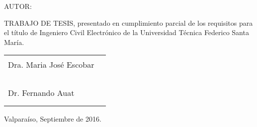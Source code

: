 \vspace{20mm}

\noindent AUTOR:

\vspace{5mm}


\vspace{15mm}

\noindent TRABAJO DE TESIS, presentado en cumplimiento parcial de
los requisitos para el t\'itulo de Ingeniero Civil Electr\'onico de la Universidad
T\'ecnica Federico Santa Mar\'ia.

\vspace{15mm}

\begin{tabular}{p{60mm}c}
Dra. Maria Jos\'e Escobar & \rule{60mm}{1pt} \\
& \\
& \\
& \\
Dr. Fernando Auat & \rule{60mm}{1pt} \\
&
\end{tabular}

\vspace{5mm}

\hfill Valpara\'iso, Septiembre de 2016.


\cleardoublepage
\newpage
\thispagestyle{empty}
\mbox{}
\cleardoublepage

\vspace{50mm}

\begin{flushright}


\end{flushright}
